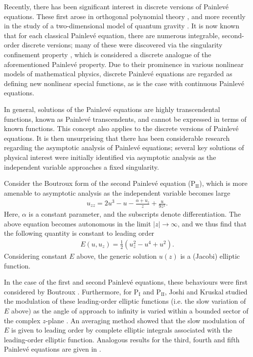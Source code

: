 \documentclass[reqno,a4paper]{amsart}
\numberwithin{equation}{section}
\theoremstyle{plain}
\theoremstyle{remark}
\newcommand\Pone{\textrm{P}_{\textrm{I}}}
\newcommand\Ptwo{\textrm{P}_{\textrm{II}}}
\begin{document}
Recently, there has been significant interest in discrete versions of Painlev\'e equations. These first arose in orthogonal polynomial theory \cite{shohat1939differential}, and more recently in the study of a two-dimensional model of quantum gravity \cite{its1990isomonodromy}. It is now known that for each classical Painlev\'e equation, there are numerous integrable, second-order discrete versions; many of these were discovered via the singularity confinement property \cite{ramani1991discrete}, which is considered a discrete analogue of the aforementioned Painlev\'e property. Due to their prominence in various nonlinear models of mathematical physics, discrete Painlev\'e equations are regarded as defining new nonlinear special functions, as is the case with continuous Painlev\'e equations.

In general, solutions of the Painlev\'e equations are highly transcendental functions, known as Painlev\'e transcendents, and cannot be expressed in terms of known functions. This concept also applies to the discrete versions of Painlev\'e equations. It is then unsurprising that there has been considerable research regarding the asymptotic analysis of Painlev\'e equations; several key solutions of physical interest were initially identified via asymptotic analysis \cite{mccoy1977painleve,wu1976spin} as the independent variable approaches a fixed singularity.

Consider the Boutroux form of the second Painlev\'e equation ($\Ptwo$), which is more amenable to asymptotic analysis as the independent variable becomes large \cite{boutroux1913recherches}
\begin{align*}
    u_{zz}=2u^3-u-\frac{\alpha+u_z}{z}+\frac{u}{9z^2}.
\end{align*}
Here, $\alpha$ is a constant parameter, and the subscripts denote differentiation. The above equation becomes autonomous in the limit $|z|\to\infty$, and we thus find that the following quantity is constant to leading order
\begin{align*}
    E(u,u_z)=\frac{1}{2}\left(u_z^2-u^4+u^2\right).
\end{align*}
Considering constant $E$ above, the generic solution $u(z)$ is a (Jacobi) elliptic function.

In the case of the first and second Painlev\'e equations, these behaviours were first considered by Boutroux \cite{boutroux1913recherches,boutroux1914recherches}. Furthermore, for $\Pone$ and $\Ptwo$, Joshi and Kruskal studied the modulation of these leading-order elliptic functions (i.e. the slow variation of $E$ above) as the angle of approach to infinity is varied within a bounded sector of the complex $z$-plane \cite{joshi1987connection,joshi1988asymptotic,joshi1992painleve}. An averaging method showed that the slow modulation of $E$ is given to leading order by complete elliptic integrals associated with the leading-order elliptic function. Analogous results for the third, fourth and fifth Painlev\'e equations are given in \cite{joshi2018asymptotic}.
\end{document}

